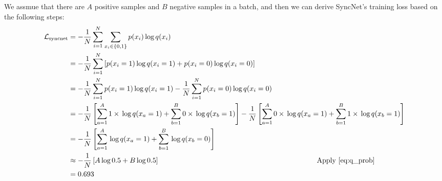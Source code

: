 We assmue that there are $A$ positive samples and $B$ negative samples in a batch, and then we can derive SyncNet's training loss based on the following steps:
\begin{align}
    \mathcal{L}_{\text{syncnet}} & = -\frac{1}{N}\sum_{i=1}^N \sum_{x_i \in \{0,1\}} p(x_i) \,\text{log}\, {q(x_i)}                                                                                                                                                                                  \\
                                 & = -\frac{1}{N}\sum_{i=1}^N \left[ p(x_i=1) \,\text{log}\, {q(x_i=1)} + p(x_i=0) \,\text{log}\, {q(x_i=0)} \right]                                                                                                                                                 \\
                                 & = -\frac{1}{N}\sum_{i=1}^N p(x_i=1) \,\text{log}\, {q(x_i=1)} -\frac{1}{N}\sum_{i=1}^N p(x_i=0) \,\text{log}\, {q(x_i=0)}                                                                                                                                         \\
                                 & = -\frac{1}{N} \left[ \sum_{a=1}^A 1 \times \,\text{log}\, {q(x_a=1)} + \sum_{b=1}^B 0 \times \,\text{log}\, {q(x_b=1)} \right] -\frac{1}{N} \left[ \sum_{a=1}^A 0 \times \,\text{log}\, {q(x_a=1)} + \sum_{b=1}^B 1 \times \,\text{log}\, {q(x_b=1)} \right]     \\
                                 & = -\frac{1}{N} \left[ \sum_{a=1}^A \,\text{log}\, {q(x_a=1)} + \sum_{b=1}^B \,\text{log}\, {q(x_b=0)} \right]                                                                                                                                                     \\
                                 & \approx -\frac{1}{N} \left[ A \, \text{log}\, 0.5 + B \, \text{log}\, 0.5 \right]           \quad \quad \quad \quad \quad \quad \quad \quad \quad \quad \quad \quad \quad \quad \quad \quad \quad \quad \quad \quad \quad \quad     \text{Apply \cref{eq:q_prob}} \\
                                 & = 0.693
\end{align}

